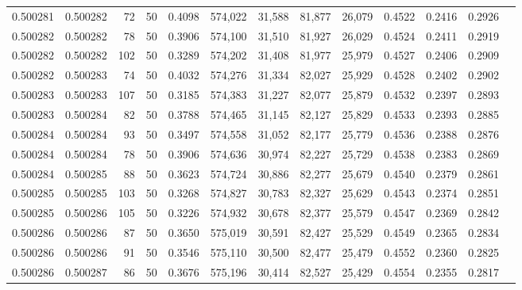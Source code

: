 \begin{tabular}{rrrrrrrrrrrrr}
0.500281 & 0.500282 &    72 &  50 &                                     0.4098 & 574,022 &  31,588 &  81,877 &  26,079 & 0.4522 & 0.2416 & 0.2926 \\
0.500282 & 0.500282 &    78 &  50 &                                     0.3906 & 574,100 &  31,510 &  81,927 &  26,029 & 0.4524 & 0.2411 & 0.2919 \\
0.500282 & 0.500282 &   102 &  50 &                                     0.3289 & 574,202 &  31,408 &  81,977 &  25,979 & 0.4527 & 0.2406 & 0.2909 \\
0.500282 & 0.500283 &    74 &  50 &                                     0.4032 & 574,276 &  31,334 &  82,027 &  25,929 & 0.4528 & 0.2402 & 0.2902 \\
0.500283 & 0.500283 &   107 &  50 &                                     0.3185 & 574,383 &  31,227 &  82,077 &  25,879 & 0.4532 & 0.2397 & 0.2893 \\
0.500283 & 0.500284 &    82 &  50 &                                     0.3788 & 574,465 &  31,145 &  82,127 &  25,829 & 0.4533 & 0.2393 & 0.2885 \\
0.500284 & 0.500284 &    93 &  50 &                                     0.3497 & 574,558 &  31,052 &  82,177 &  25,779 & 0.4536 & 0.2388 & 0.2876 \\
0.500284 & 0.500284 &    78 &  50 &                                     0.3906 & 574,636 &  30,974 &  82,227 &  25,729 & 0.4538 & 0.2383 & 0.2869 \\
0.500284 & 0.500285 &    88 &  50 &                                     0.3623 & 574,724 &  30,886 &  82,277 &  25,679 & 0.4540 & 0.2379 & 0.2861 \\
0.500285 & 0.500285 &   103 &  50 &                                     0.3268 & 574,827 &  30,783 &  82,327 &  25,629 & 0.4543 & 0.2374 & 0.2851 \\
0.500285 & 0.500286 &   105 &  50 &                                     0.3226 & 574,932 &  30,678 &  82,377 &  25,579 & 0.4547 & 0.2369 & 0.2842 \\
0.500286 & 0.500286 &    87 &  50 &                                     0.3650 & 575,019 &  30,591 &  82,427 &  25,529 & 0.4549 & 0.2365 & 0.2834 \\
0.500286 & 0.500286 &    91 &  50 &                                     0.3546 & 575,110 &  30,500 &  82,477 &  25,479 & 0.4552 & 0.2360 & 0.2825 \\
0.500286 & 0.500287 &    86 &  50 &                                     0.3676 & 575,196 &  30,414 &  82,527 &  25,429 & 0.4554 & 0.2355 & 0.2817 \\

\end{tabular}
